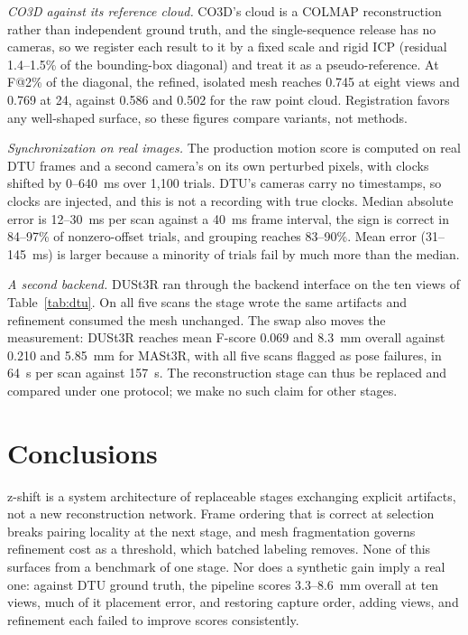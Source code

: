 \documentclass[conference]{IEEEtran}
\begin{document}
\emph{CO3D against its reference cloud.} CO3D's cloud is a COLMAP reconstruction
rather than independent ground truth, and the single-sequence release has no
cameras, so we register each result to it by a fixed scale and rigid ICP (residual
1.4--1.5\% of the bounding-box diagonal) and treat it as a pseudo-reference. At
F@2\% of the diagonal, the refined, isolated mesh reaches 0.745 at eight views and
0.769 at 24, against 0.586 and 0.502 for the raw point cloud. Registration favors
any well-shaped surface, so these figures compare variants, not methods.

\emph{Synchronization on real images.} The production motion score is computed on real DTU
frames and a second camera's on its own perturbed pixels, with clocks shifted by
0--640~ms over 1,100 trials. DTU's cameras carry no timestamps, so clocks are
injected, and this is not a recording with true clocks. Median absolute error is 12--30~ms per scan
against a 40~ms frame interval, the sign is correct in 84--97\% of nonzero-offset trials, and
grouping reaches 83--90\%. Mean error (31--145~ms) is larger because a minority
of trials fail by much more than the median.

\emph{A second backend.} DUSt3R \cite{b6} ran through the backend interface on the ten views of
Table~\ref{tab:dtu}. On all five scans the stage wrote the same artifacts and
refinement consumed the mesh unchanged. The swap also moves the measurement: DUSt3R
reaches mean F-score 0.069 and 8.3~mm overall against 0.210 and 5.85~mm for MASt3R,
with all five scans flagged as pose failures, in 64~s per scan against 157~s. The
reconstruction stage can thus be replaced and compared under one protocol; we make
no such claim for other stages.

\section{Conclusions}

z-shift is a system architecture of replaceable stages exchanging explicit
artifacts, not a new reconstruction network. Frame ordering that is correct at
selection breaks pairing locality at the next stage, and mesh fragmentation governs
refinement cost as a threshold, which batched labeling removes. None of this
surfaces from a benchmark of one stage. Nor does a synthetic gain imply a real one:
against DTU ground truth, the pipeline scores 3.3--8.6~mm overall at ten views, much
of it placement error, and restoring capture order, adding views, and refinement
each failed to improve scores consistently.
\end{document}
